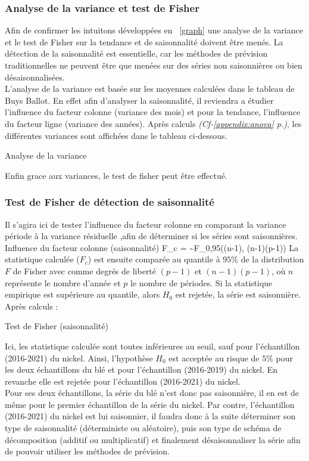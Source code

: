 \subsubsection{Analyse de la variance et test de Fisher}
Afin de confirmer les intuitons développées en ~\ref{graph} une analyse de la variance et le test de Fisher sur la tendance et de 
saisonnalité doivent être menés. La détection de la saisonnalité est essentielle, car les méthodes de prévision traditionnelles
ne peuvent être que menées sur des séries non saisonnières ou bien désaisonnalisées.\\[11pt]
L'analyse de la variance est basée sur les moyennes calculées dans le tableau de Buys Ballot. En effet afin d'analyser la saisonnalité, 
il reviendra a étudier l'influence du facteur colonne (variance des mois) et pour la tendance, l'influence du facteur ligne (variance des années).
Après calculs \textit{(Cf-\ref{appendix:anova} p.\pageref{appendix:anova})}, les différentes variances sont affichées dans le tableau ci-dessous.

\begin{table}[H]
    \centering
    \caption{Analyse de la variance}
    \sffamily
    
\end{table}

Enfin grace aux variances, le test de fisher peut être effectué.
\subsubsection*{Test de Fisher de détection de saisonnalité}
Il s'agira ici de tester l'influence du facteur colonne en comparant la variance période à la variance résiduelle
,afin de déterminer si les séries sont saisonnières.
    {Influence du facteur colonne (saisonnalité)}
    {F_{c} =  \sim F_{0,95}((n-1), (n-1)(p-1))}
La statistique calculée ($F_{c}$) est ensuite comparée au quantile à $95\%$ de la distribution $F$ de
Fisher avec comme degrés de liberté $(p-1)$ et $(n-1)(p-1)$, où $n$ représente le nombre d'année
et $p$ le nombre de périodes. Si la statistique empirique est supérieure au quantile,
alors $ H_{0} $ est rejetée, la série est saisonnière. Après calculs :
\begin{table}[H]
    \centering
    \caption{Test de Fisher (saisonnalité)}
    \sffamily
    
\end{table}
Ici, les statistique calculée sont toutes inférieures au seuil, sauf pour l'échantillon (2016-2021)
du nickel.  Ainsi, l'hypothèse $H_{0}$ est acceptée au risque de $5\%$ pour les deux échantillons du blé
et pour l'échantillon (2016-2019) du nickel. En revanche elle est rejetée pour l'échantillon (2016-2021) du nickel.\\[11pt]
Pour ses deux échantillons, la série du blé n'est donc pas saisonnière, il en est de même pour le premier échantillon de la série du nickel. 
Par contre, l'échantillon (2016-2021) du nickel est lui saisonnier, il faudra donc à la suite 
déterminer son type de saisonnalité (déterministe ou aléatoire), puis son type de schéma de décomposition
(additif ou multiplicatif) et finalement désaisonnaliser la série afin de pouvoir utiliser les méthodes de prévision.

